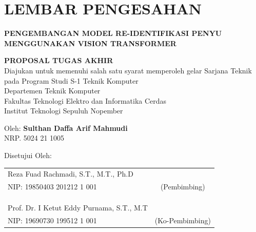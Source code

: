 \chapter*{LEMBAR PENGESAHAN}

\thispagestyle{empty}

\begin{center}
  \textbf{PENGEMBANGAN MODEL RE-IDENTIFIKASI PENYU MENGGUNAKAN VISION TRANSFORMER}
\end{center}

\begingroup
\small

\begin{center}
  \textbf{PROPOSAL TUGAS AKHIR} \\
  Diajukan untuk memenuhi salah satu syarat memperoleh gelar
  Sarjana Teknik pada
  Program Studi S-1 Teknik Komputer \\
  Departemen Teknik Komputer \\
  Fakultas Teknologi Elektro dan Informatika Cerdas \\
  Institut Teknologi Sepuluh Nopember
\end{center}

\begin{center}
  Oleh: \textbf{Sulthan Daffa Arif Mahmudi} \\
  NRP. 5024 21 1005
\end{center}

\begin{center}
  Disetujui Oleh:
\end{center}

\vspace{10ex}

\begingroup
\setlength{\tabcolsep}{0pt}

\noindent
\begin{tabularx}{\textwidth}{X c}
  Reza Fuad Rachmadi, S.T., M.T., Ph.D&                 \\
  NIP: 19850403 201212 1 001    & (Pembimbing)    \\
                                &                 \\
                                &                 \\
                                &                 \\
  Prof. Dr. I Ketut Eddy Purnama, S.T., M.T &                 \\
  NIP: 19690730 199512 1 001    & (Ko-Pembimbing) \\
\end{tabularx}
\endgroup

